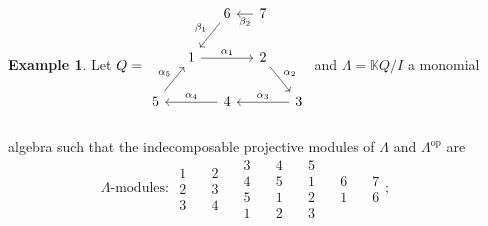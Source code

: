 \documentclass{conm-p-l}
\newcommand{\op}{\mathrm{op}}
\theoremstyle{definition}
\newtheorem{example}[theorem]{Example}
\theoremstyle{remark}
\numberwithin{equation}{section}
\begin{document}
\begin{example}
\label{ex:right serial}
\begingroup
\setlength\arraycolsep{1pt}
Let $Q=
\begin{tikzcd}[ampersand replacement=\&,column sep=small]
{} \& {} \& 6 \arrow[dl, "\beta_1",swap] \& 7 \arrow[l, "\beta_2"] \\
{} \& 1 \arrow[dl,leftarrow,"\alpha_5",swap] \arrow[rr,"\alpha_1"] \& {} \& 2 \arrow[dr,"\alpha_2"] \& {} \\
5 \arrow[rr,leftarrow,"\alpha_4"] \& {} \& 4 \& {} \& 3 \arrow[ll,"\alpha_3",swap] \\
\end{tikzcd}$
and $\Lambda=\mathbb{K}Q/I$ a monomial algebra such that the indecomposable projective modules of $\Lambda$ and $\Lambda^{\op}$ are
\[
\text{$\Lambda$-modules: } \begin{matrix} 1 \\ 2 \\ 3 \end{matrix} \quad \begin{matrix} 2 \\ 3 \\ 4 \end{matrix} \quad \begin{matrix} 3 \\ 4 \\ 5 \\ 1 \end{matrix} \quad \begin{matrix} 4 \\ 5 \\ 1 \\ 2 \end{matrix} \quad \begin{matrix} 5 \\ 1 \\ 2 \\ 3 \end{matrix} \quad \begin{matrix} 6 \\ 1 \end{matrix} \quad \begin{matrix} 7 \\ 6 \end{matrix}; \qquad
\]
\end{example}
\end{document}
